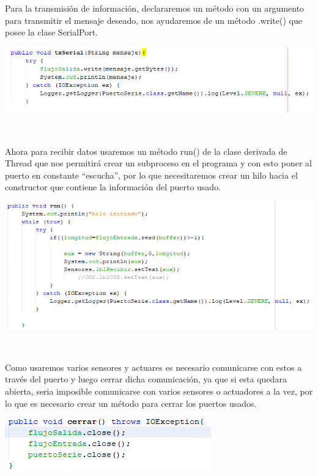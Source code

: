 \documentclass[12pt]{report}
\begin{document}
Para la transmisión de información, declararemos un método con un argumento para transmitir el mensaje deseado, nos ayudaremos de un método .write() que posee la clase SerialPort.
\begin{center}
\includegraphics[scale=0.8]{Documento/Figuras/3.PNG}
\begin{scriptsize}
\\ 
\end{scriptsize}
\end{center}
Ahora para recibir datos usaremos un método run() de la clase derivada de Thread que nos permitirá crear un subproceso en el programa y con esto poner al puerto en constante “escucha”, por lo que necesitaremos crear un hilo hacia el constructor que contiene la información del puerto usado.
\begin{center}
\includegraphics[scale=0.8]{Documento/Figuras/4.PNG}
\begin{scriptsize}
\\ 
\end{scriptsize}
\end{center}
Como usaremos varios sensores y actuares es necesario comunicarse con estos a través del puerto y luego cerrar dicha comunicación, ya que si esta quedara abierta, seria imposible comunicarse con varios sensores o actuadores a la vez, por lo que es necesario crear un método para cerrar los puertos usados.
\begin{center}
\includegraphics[scale=0.8]{Documento/Figuras/5.PNG}
\begin{scriptsize}
\\ 
\end{scriptsize}
\end{center}
\end{document}
